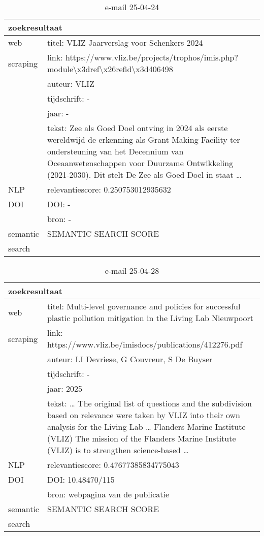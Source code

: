 \begin{table}[h!]
    \caption{e-mail 25-04-24}
    \centering
    \begin{tabularx}{\textwidth}{|p{4cm}|X|} 
        \hline
        \multicolumn{2}{|X|}{\textbf{zoekresultaat}} \\
        \hline
        web &titel: VLIZ Jaarverslag voor Schenkers 2024\\
        scraping&link: https://www.vliz.be/projects/trophos/imis.php?module\textbackslash x3dref\textbackslash x26refid\textbackslash x3d406498\\
        &auteur: VLIZ\\
        &tijdschrift: -\\
        &jaar: -\\
        &tekst: Zee als Goed Doel ontving in 2024 als eerste wereldwijd de erkenning als Grant Making Facility ter ondersteuning van het Decennium van Oceaanwetenschappen voor Duurzame Ontwikkeling (2021-2030). Dit stelt De Zee als Goed Doel in staat …\\
        \hline
        NLP&relevantiescore: 0.250753012935632\\
        \hline
        DOI&DOI: -\\
        &bron: -\\
        \hline
        semantic&SEMANTIC SEARCH SCORE\\
        search&\\
        \hline
    \end{tabularx}
    \label{table:email20250424}
\end{table}
\begin{table}[h!]
    \caption{e-mail 25-04-28}
    \centering
    \begin{tabularx}{\textwidth}{|p{4cm}|X|} 
        \hline
        \multicolumn{2}{|X|}{\textbf{zoekresultaat}} \\
        \hline
        web &titel: Multi-level governance and policies for successful plastic pollution mitigation in the Living Lab Nieuwpoort\\
        scraping&link: https://www.vliz.be/imisdocs/publications/412276.pdf\\
        &auteur: LI Devriese, G Couvreur, S De Buyser\\
        &tijdschrift: -\\
        &jaar: 2025\\
        &tekst: … The original list of questions and the subdivision based on relevance were taken by VLIZ into their own analysis for the Living Lab … Flanders Marine Institute (VLIZ) The mission of the Flanders Marine Institute (VLIZ) is to strengthen science-based …\\
        \hline
        NLP&relevantiescore: 0.47677385834775043\\
        \hline
        DOI&DOI: 10.48470/115\\
        &bron: webpagina van de publicatie\\
        \hline
        semantic&SEMANTIC SEARCH SCORE\\
        search&\\
        \hline
    \end{tabularx}
    \label{table:email20250428}
\end{table}

